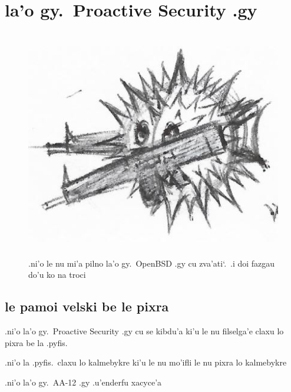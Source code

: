 \documentclass{report}
\newcommand\sds{\spacefactor\sfcode`.\ \space}
\begin{document}
\chapter{la'o gy.\ Proactive Security .gy}
\begin{figure}[ht]
	\centering
	\includegraphics[height=10cm]{proactivesecurity/proactivesecurity.png}
	\caption[center]{.ni'o le nu mi'a pilno la'o gy.\ OpenBSD .gy cu zva'ati\sds  .i doi fazgau do'u ko na troci}
\end{figure}
\section{le pamoi velski be le pixra}
.ni'o la'o gy.\ Proactive Security .gy cu se kibdu'a ki'u le nu filselga'e claxu lo pixra be la .pyfis.

.ni'o la .pyfis.\ claxu lo kalmebykre ki'u le nu mo'ifli le nu pixra lo kalmebykre

.ni'o la'o gy.\ AA-12 .gy .u'enderfu xacyce'a
\end{document}
